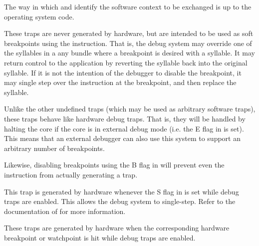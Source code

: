 The way in which  and  identify the software context to be
exchanged is up to the operating system code.


\debug{}

These traps are never generated by hardware, but are intended to be used as soft
breakpoints using the  instruction. That is, the debug system may
override one of the syllables in a any bundle where a breakpoint is desired with
a  syllable. It may return control to the application by reverting
the  syllable back into the original syllable. If it is not the
intention of the debugger to disable the breakpoint, it may single step over
the instruction at the breakpoint, and then replace the  syllable.

Unlike the other undefined traps (which may be used as arbitrary software
traps), these traps behave like hardware debug traps. That is, they will be
handled by halting the core if the core is in external debug mode (i.e. the E
flag in  is set). This means that an external debugger can also use
this system to support an arbitrary number of breakpoints.

Likewise, disabling breakpoints using the B flag in  will prevent even
the  instruction from actually generating a trap.



This trap is generated by hardware whenever the S flag in  is set
while debug traps are enabled. This allows the debug system to single-step.
Refer to the documentation of  for more information.


\debug{}

These traps are generated by hardware when the corresponding hardware breakpoint
or watchpoint is hit while debug traps are enabled.

